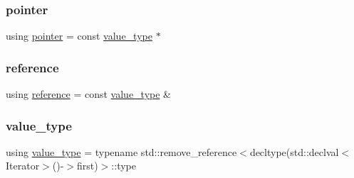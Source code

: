 \subsubsection{\texorpdfstring{pointer}{pointer}}
{\footnotesize\ttfamily using \mbox{\hyperlink{classstanfordcpplib_1_1collections_1_1ProjectingIterator_a6bfec6a77e6f8fac8b106db3094ac7f6}{pointer}} =  const \mbox{\hyperlink{classstanfordcpplib_1_1collections_1_1ProjectingIterator_aec6efe17fc77cbe65b6427ab7b2a1b34}{value\+\_\+type}} $\ast$}

\mbox{\label{classstanfordcpplib_1_1collections_1_1ProjectingIterator_ab734e7d93a20160ecd4ee87cec8336af}} 
\subsubsection{\texorpdfstring{reference}{reference}}
{\footnotesize\ttfamily using \mbox{\hyperlink{classstanfordcpplib_1_1collections_1_1ProjectingIterator_ab734e7d93a20160ecd4ee87cec8336af}{reference}} =  const \mbox{\hyperlink{classstanfordcpplib_1_1collections_1_1ProjectingIterator_aec6efe17fc77cbe65b6427ab7b2a1b34}{value\+\_\+type}} \&}

\mbox{\label{classstanfordcpplib_1_1collections_1_1ProjectingIterator_aec6efe17fc77cbe65b6427ab7b2a1b34}} 
\subsubsection{\texorpdfstring{value\+\_\+type}{value\_type}}
{\footnotesize\ttfamily using \mbox{\hyperlink{classstanfordcpplib_1_1collections_1_1ProjectingIterator_aec6efe17fc77cbe65b6427ab7b2a1b34}{value\+\_\+type}} =  typename std\+::remove\+\_\+reference$<$decltype(std\+::declval$<$Iterator$>$()-\/$>$first)$>$\+::type}



